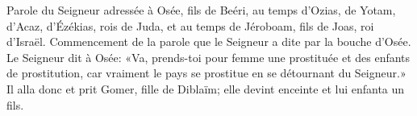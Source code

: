 Parole du Seigneur adressée à Osée, fils de Beéri,
	au temps d’Ozias, de Yotam, d’Acaz, d’Ézékias, rois de Juda,
	et au temps de Jéroboam, fils de Joas, roi d’Israël.
Commencement de la parole que le Seigneur a dite par la bouche d’Osée.
Le Seigneur dit à Osée:
	«Va, prends-toi pour femme une prostituée et des enfants de prostitution,
	car vraiment le pays se prostitue en se détournant du Seigneur.»
Il alla donc et prit Gomer, fille de Diblaïm;
	elle devint enceinte et lui enfanta un fils.
